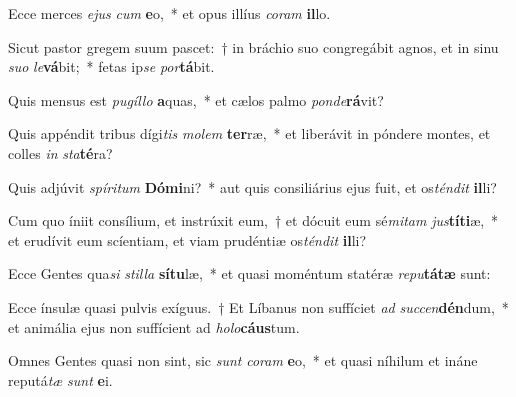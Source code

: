 \item Ecce merces \textit{e}\textit{jus} \textit{cum} \textbf{e}o,~* et opus illíus \textit{co}\textit{ram} \textbf{il}lo.
\item Sicut pastor gregem suum pascet:~† in bráchio suo congregábit agnos, et in sinu \textit{su}\textit{o} \textit{le}\textbf{vá}bit;~* fetas ip\textit{se} \textit{por}\textbf{tá}bit.
\item Quis mensus est \textit{pu}\textit{gíl}\textit{lo} \textbf{a}quas,~* et cælos palmo \textit{pon}\textit{de}\textbf{rá}vit?
\item Quis appéndit tribus dígi\textit{tis} \textit{mo}\textit{lem} \textbf{ter}ræ,~* et liberávit in póndere montes, et colles \textit{in} \textit{sta}\textbf{té}ra?
\item Quis adjúvit \textit{spí}\textit{ri}\textit{tum} \textbf{Dó}\textbf{mi}ni?~* aut quis consiliárius ejus fuit, et os\textit{tén}\textit{dit} \textbf{il}li?
\item Cum quo íniit consílium, et instrúxit eum,~† et dócuit eum sé\textit{mi}\textit{tam} \textit{jus}\textbf{tí}\textbf{ti}æ,~* et erudívit eum scíentiam, et viam prudéntiæ os\textit{tén}\textit{dit} \textbf{il}li?
\item Ecce Gentes qua\textit{si} \textit{stil}\textit{la} \textbf{sí}\textbf{tu}læ,~* et quasi moméntum statéræ \textit{re}\textit{pu}\textbf{tá}\textbf{tæ} sunt:
\item Ecce ínsulæ quasi pulvis exíguus.~† Et Líbanus non suffíciet \textit{ad} \textit{suc}\textit{cen}\textbf{dén}dum,~* et animália ejus non suffícient ad \textit{ho}\textit{lo}\textbf{cáus}tum.
\item Omnes Gentes quasi non sint, sic \textit{sunt} \textit{co}\textit{ram} \textbf{e}o,~* et quasi níhilum et ináne reputá\textit{tæ} \textit{sunt} \textbf{e}i.
